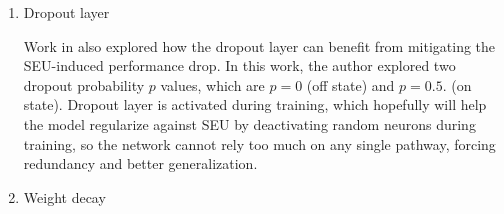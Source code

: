 \documentclass[ %
                    author={Revalda Putawara},
                supervisor={Dr. James Pope},
                    degree={MSc},
                     title={Robustness of Bayesian Neural Networks Design Choices Against Weight and Bias Perturbation Induced by Single Event Upsets (SEUs)},
                      type={},
                      year={2025}]{dissertation}
\begin{document}
\begin{enumerate}[noitemsep, topsep=0pt]
\begin{algorithm}[h]
\textbf{2.} For each patch $P_{n,c}$, compute the top-2 largest values:
\[
(\text{max1}, \text{max2}) = \text{TopK}(P_{n,c}, k=2)
\]
where $\text{max1}$ is the largest and $\text{max2}$ is the second-largest value in each window.\;

\textbf{3.} Detect abnormal activations (spikes):
\[
S_{n,c,l} =
\begin{cases}
1 & \text{if } \text{max1}_{n,c,l} > \theta,\\
0 & \text{otherwise}
\end{cases}
\]
for every batch $n$, channel $c$, and window index $l$.\;

\textbf{4.} If the algorithm is set to only see the spiked values without altering the output, set:
\[
Y_{n,c,l} = \text{max1}_{n,c,l}
\]
If the reliable maxpooling is used to overwrite the spiked value, replace detected spikes with the second-largest value:
\[
Y_{n,c,l} =
\begin{cases}
\text{max2}_{n,c,l}, & S_{n,c,l}=1 \\
\text{max1}_{n,c,l}, & S_{n,c,l}=0
\end{cases}
\]
\textbf{5.} Reshape $Y$ back to spatial dimensions:
\[
Y \in \mathbb{R}^{N \times C \times H' \times W'}, \quad
H' = \frac{H}{k},\quad W' = \frac{W}{k}
\]
\label{alg:smartpooling}
\end{algorithm}

In this research, we typically set the value of Threshold $\theta=10$. In activating this SmartPooling, we replace every MaxPooling that was applied in our paper with it. The smartpooling algorithm is shown in Algorithm \ref{alg:smartpooling}.


\item Dropout layer

Work in \cite{dennispoperobustcnn} also explored how the dropout layer can benefit from mitigating the SEU-induced performance drop. In this work, the author explored two dropout probability $p$ values, which are $p=0$ (off state) and $p=0.5$. (on state). Dropout layer is activated during training, which hopefully will help the model regularize against SEU by deactivating random neurons during training, so the network cannot rely too much on any single pathway, forcing redundancy and better generalization.


\item Weight decay


\end{enumerate}
\end{document}
